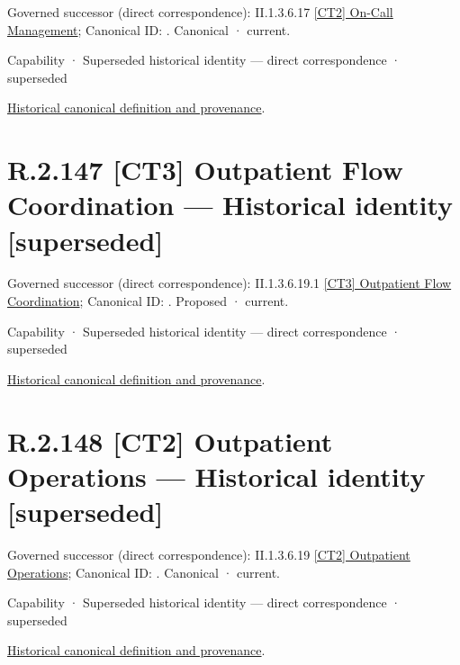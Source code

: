 {\small Governed successor (direct correspondence): II.1.3.6.17 \hyperref[element:b16cef8f2bfd4b92948ec75cbcfa7b9a]{[CT2] On-Call Management}; Canonical ID: \texttt{}. Canonical · current.}\par
\label{element:c8e6e66e8718493c9093f37d129f9ff2}
{\small Capability · Superseded historical identity — direct correspondence · superseded}\par
\href{../../../../../../../continuum/strategy/capability/c8e6e66e8718493c9093f37d129f9ff2.md}{Historical canonical definition and provenance}.\par
\section*{R.2.147 [CT3] Outpatient Flow Coordination — Historical identity [superseded]}
\label{navigation:R.2.147}

{\small Governed successor (direct correspondence): II.1.3.6.19.1 \hyperref[element:799ea278af014168b9b534e5fdadc6d1]{[CT3] Outpatient Flow Coordination}; Canonical ID: \texttt{}. Proposed · current.}\par
\label{element:e6c59c7b72fe44169a5fdfd08a5e91c4}
{\small Capability · Superseded historical identity — direct correspondence · superseded}\par
\href{../../../../../../../continuum/strategy/capability/e6c59c7b72fe44169a5fdfd08a5e91c4.md}{Historical canonical definition and provenance}.\par
\section*{R.2.148 [CT2] Outpatient Operations — Historical identity [superseded]}
\label{navigation:R.2.148}

{\small Governed successor (direct correspondence): II.1.3.6.19 \hyperref[element:21399d52b9624ddfbeb786f1d72e40c3]{[CT2] Outpatient Operations}; Canonical ID: \texttt{}. Canonical · current.}\par
\label{element:3db41bc06ade4f9088eec7b8aedd7448}
{\small Capability · Superseded historical identity — direct correspondence · superseded}\par
\href{../../../../../../../continuum/strategy/capability/3db41bc06ade4f9088eec7b8aedd7448.md}{Historical canonical definition and provenance}.\par
